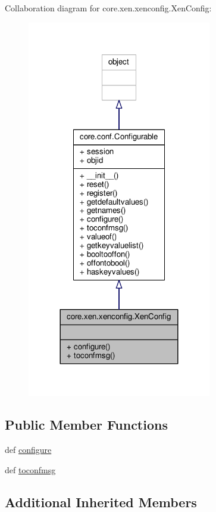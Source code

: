 Collaboration diagram for core.\+xen.\+xenconfig.\+Xen\+Config\+:
\nopagebreak
\begin{figure}[H]
\begin{center}
\leavevmode
\includegraphics[width=228pt]{classcore_1_1xen_1_1xenconfig_1_1_xen_config__coll__graph}
\end{center}
\end{figure}
\subsection*{Public Member Functions}
\begin{DoxyCompactItemize}
\item 
def \hyperlink{classcore_1_1xen_1_1xenconfig_1_1_xen_config_ae3932a66cac50f0491a4f653653a7ba2}{configure}
\item 
def \hyperlink{classcore_1_1xen_1_1xenconfig_1_1_xen_config_a54ebefc86fb74cbb39551218572ecfb3}{toconfmsg}
\end{DoxyCompactItemize}
\subsection*{Additional Inherited Members}


